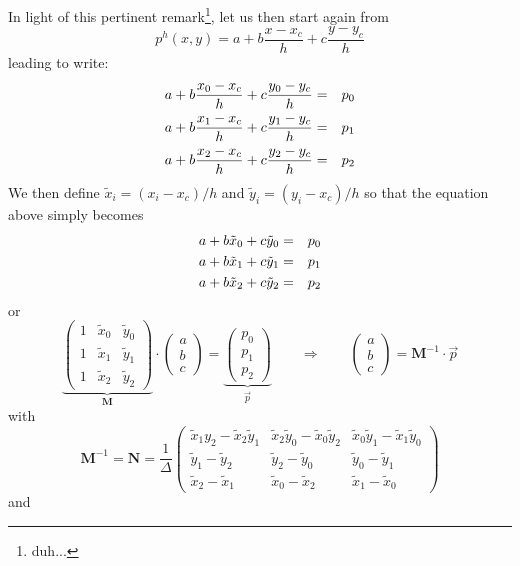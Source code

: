 In light of this pertinent remark\footnote{duh...}, let us then start again from 
\[
p^h(x,y) = a+b\frac{x-x_c}{h}+c \frac{y-y_c}{h}
\]
leading to write:
\begin{eqnarray}
a + b \frac{x_0-x_c}{h} + c\frac{y_0-y_c}{h} &=& p_0 \nonumber\\
a + b \frac{x_1-x_c}{h} + c\frac{y_1-y_c}{h} &=& p_1 \nonumber\\
a + b \frac{x_2-x_c}{h} + c\frac{y_2-y_c}{h} &=& p_2 \nonumber
\end{eqnarray}
We then define $\tilde{x}_i=(x_i-x_c)/h$ and $\tilde{y}_i=(y_i-x_c)/h$ so that 
the equation above simply becomes
\begin{eqnarray}
a + b\tilde{x}_0 + c\tilde{y}_0 &=& p_0 \nonumber\\
a + b\tilde{x}_1 + c\tilde{y}_1 &=& p_1 \nonumber\\
a + b\tilde{x}_2 + c\tilde{y}_2 &=& p_2 \nonumber
\end{eqnarray}
or
\[
\underbrace{
\left(\begin{array}{ccc}
1 & \tilde{x}_0 & \tilde{y}_0 \\
1 & \tilde{x}_1 & \tilde{y}_1 \\
1 & \tilde{x}_2 & \tilde{y}_2 
\end{array}\right)
}_{{\bm M}}
\cdot 
\left(\begin{array}{ccc}
a \\ b \\ c
\end{array}\right)
=
\underbrace{
\left(\begin{array}{ccc}
p_0 \\ p_1 \\ p_2
\end{array}\right)
}_{\vec{p}}
\qquad
\Rightarrow
\qquad
\left(\begin{array}{ccc}
a \\ b \\ c
\end{array}\right)
=
{\bm M}^{-1} \cdot \vec{p}
\]
with
\[
{\bm M}^{-1} 
= {\bm N} 
= \frac{1}{\Delta}
\left(
\begin{array}{ccc}
\tilde{x}_1y_2-\tilde{x}_2\tilde{y}_1 
& \tilde{x}_2\tilde{y}_0-\tilde{x}_0\tilde{y}_2 
& \tilde{x}_0\tilde{y}_1-\tilde{x}_1\tilde{y}_0 \\
\tilde{y}_1-\tilde{y}_2 & \tilde{y}_2-\tilde{y}_0 & \tilde{y}_0-\tilde{y}_1 \\
\tilde{x}_2-\tilde{x}_1 & \tilde{x}_0-\tilde{x}_2 & \tilde{x}_1-\tilde{x}_0
\end{array}
\right)
\]
and
